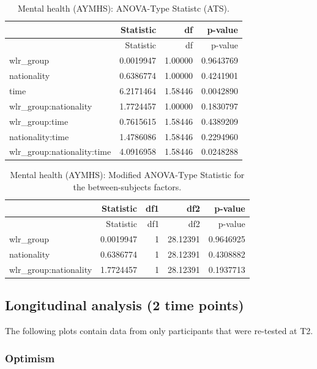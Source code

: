 \documentclass[]{article}
\begin{document}
\begin{longtable}[]{@{}lrrr@{}}
\caption{Mental health (AYMHS): ANOVA-Type Statistc
(ATS).}\tabularnewline
\toprule
& Statistic & df & p-value\tabularnewline
\midrule
\endfirsthead
\toprule
& Statistic & df & p-value\tabularnewline
\midrule
\endhead
wlr\_group & 0.0019947 & 1.00000 & 0.9643769\tabularnewline
nationality & 0.6386774 & 1.00000 & 0.4241901\tabularnewline
time & 6.2171464 & 1.58446 & 0.0042890\tabularnewline
wlr\_group:nationality & 1.7724457 & 1.00000 & 0.1830797\tabularnewline
wlr\_group:time & 0.7615615 & 1.58446 & 0.4389209\tabularnewline
nationality:time & 1.4786086 & 1.58446 & 0.2294960\tabularnewline
wlr\_group:nationality:time & 4.0916958 & 1.58446 &
0.0248288\tabularnewline
\bottomrule
\end{longtable}

\begin{longtable}[]{@{}lrrrr@{}}
\caption{Mental health (AYMHS): Modified ANOVA-Type Statistic for the
between-subjects factors.}\tabularnewline
\toprule
& Statistic & df1 & df2 & p-value\tabularnewline
\midrule
\endfirsthead
\toprule
& Statistic & df1 & df2 & p-value\tabularnewline
\midrule
\endhead
wlr\_group & 0.0019947 & 1 & 28.12391 & 0.9646925\tabularnewline
nationality & 0.6386774 & 1 & 28.12391 & 0.4308882\tabularnewline
wlr\_group:nationality & 1.7724457 & 1 & 28.12391 &
0.1937713\tabularnewline
\bottomrule
\end{longtable}

\newpage

\hypertarget{longitudinal-analysis-2-time-points}{%
\subsection{Longitudinal analysis (2 time
points)}\label{longitudinal-analysis-2-time-points}}

The following plots contain data from only participants that were
re-tested at T2.

\hypertarget{optimism-1}{%
\subsubsection{Optimism}\label{optimism-1}}
\end{document}
